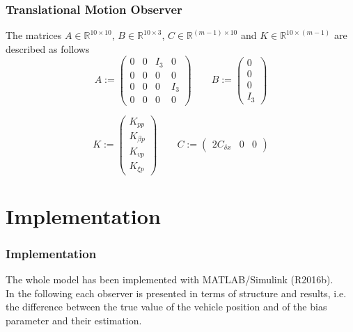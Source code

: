 \documentclass{beamer}
\begin{document}
		

	\begin{frame}
		\frametitle{Translational Motion Observer}
		The matrices $A \in \mathbb{R}^{10\times 10}$, $B \in \mathbb{R}^{10\times 3}$, $C \in \mathds{R}^{(m-1) \times 10} $ and $K \in \mathds{R}^{10 \times (m-1)}$ are described as follows
		$$
		A :=
		\begin{pmatrix}
		0 & 0 & I_3 & 0 \\ 
		0 & 0 & 0 & 0 \\
		0 & 0 & 0 & I_3 \\
		0 & 0 & 0 & 0
		\end{pmatrix}
		\qquad
		B := 
		\begin{pmatrix}
		0 \\ 0 \\ 0 \\ I_3
		\end{pmatrix}
		$$
		
		$$
		K := 
		\begin{pmatrix}
		K_{pp} \\ K_{\beta p} \\ K_{vp} \\ K_{\xi p}
		\end{pmatrix}
		\qquad
		C :=
		\begin{pmatrix}
		2C_{\delta x} & 0 & 0
		\end{pmatrix}
		$$
	\end{frame}
\section{Implementation}	
	\begin{frame}
		\frametitle{Implementation}
		The whole model has been implemented with MATLAB/Simulink (R2016b).
		\\
		\vspace{0.5cm}
		In the following each observer is presented in terms of structure and results, i.e. the difference between the true value of the vehicle position and of the bias parameter and their estimation.
	\end{frame}
	
\end{document}
